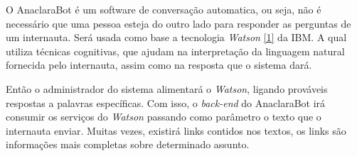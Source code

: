 \par O AnaclaraBot é um software de conversação automatica, ou seja, não é necessário que uma pessoa esteja do outro lado para responder as perguntas de um internauta. Será usada como base a tecnologia \emph{Watson} \hyperref[watson]{[1]} da IBM. A qual utiliza técnicas cognitivas, que ajudam na interpretação da linguagem natural fornecida pelo internauta, assim como na resposta que o sistema dará.

\par Então o administrador do sistema alimentará o \emph{Watson}, ligando prováveis respostas a palavras específicas. Com isso, o \emph{back-end} do AnaclaraBot irá consumir os serviços do \emph{Watson} passando como parâmetro o texto que o internauta enviar. Muitas vezes, existirá links contidos nos textos, os links são informações mais completas sobre determinado assunto.